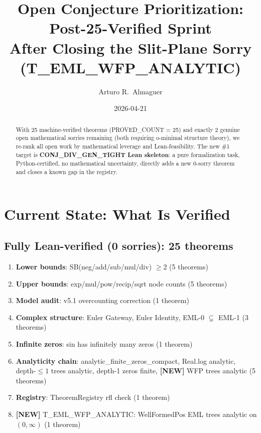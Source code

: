 \documentclass[12pt]{article}
\title{\textbf{Open Conjecture Prioritization: Post-25-Verified Sprint}\\[0.4em]
\large After Closing the Slit-Plane Sorry (T\_EML\_WFP\_ANALYTIC)}
\author{Arturo R.\ Almaguer}
\date{2026-04-21}
\theoremstyle{definition}
\begin{document}
\maketitle

\begin{abstract}
With 25 machine-verified theorems (PROVED\_COUNT = 25) and exactly 2 genuine open
mathematical sorries remaining (both requiring o-minimal structure theory), we
re-rank all open work by mathematical leverage and Lean-feasibility.
The new \#1 target is \textbf{CONJ\_DIV\_GEN\_TIGHT Lean skeleton}: a pure
formalization task, Python-certified, no mathematical uncertainty, directly
adds a new 0-sorry theorem and closes a known gap in the registry.
\end{abstract}

\section{Current State: What Is Verified}

\subsection{Fully Lean-verified (0 sorries): 25 theorems}

\begin{enumerate}[noitemsep]
  \item \textbf{Lower bounds}: SB(neg/add/sub/mul/div) $\geq 2$ (5 theorems)
  \item \textbf{Upper bounds}: exp/mul/pow/recip/sqrt node counts (5 theorems)
  \item \textbf{Model audit}: v5.1 overcounting correction (1 theorem)
  \item \textbf{Complex structure}: Euler Gateway, Euler Identity, EML-0 $\subsetneq$ EML-1 (3 theorems)
  \item \textbf{Infinite zeros}: sin has infinitely many zeros (1 theorem)
  \item \textbf{Analyticity chain}: analytic\_finite\_zeros\_compact, Real.log analytic,
    depth-$\leq 1$ trees analytic, depth-1 zeros finite, \textbf{[NEW]} WFP trees analytic (5 theorems)
  \item \textbf{Registry}: TheoremRegistry rfl check (1 theorem)
  \item \textbf{[NEW]} T\_EML\_WFP\_ANALYTIC: WellFormedPos EML trees analytic on $(0,\infty)$ (1 theorem)
\end{enumerate}
\end{document}

